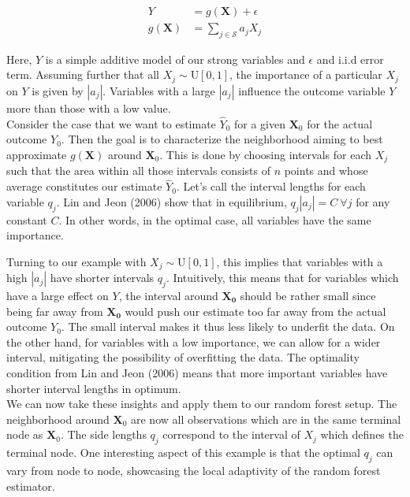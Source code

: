 {\begin{align*}
    Y &= g(\mathbf{X}) + \epsilon \\
    g(\mathbf{X}) &= \sum_{j \in \mathcal{S}} a_j X_j
\end{align*}

Here, $Y$ is a simple additive model of our strong variables and $\epsilon$ and i.i.d error term.
Assuming further that all $X_j \sim \text{U}[0, 1]$, the importance of a particular $X_j$ on $Y$ is given by $|a_j|$. Variables with a large $|a_j|$ influence the outcome variable $Y$ more than those with a low value. \\


Consider the case that we want to estimate $\hat{Y}_0$ for a given $\mathbf{X}_0$ for the actual outcome $Y_0$. 
Then the goal is to characterize the neighborhood aiming to best approximate $g(\mathbf{X})$ around $\mathbf{X}_0$. 
This is done by choosing intervals for each $X_j$ such that the area within all those intervals consists of $n$ points and whose average constitutes our estimate $\hat{Y}_0$. 
Let's call the interval lengths for each variable $q_j$. Lin and Jeon (2006) show that in equilibrium, $q_j |a_j| = C \ \forall j$ for any constant $C$. 
In other words, in the optimal case, all variables have the same importance. 

Turning to our example with $X_j \sim \text{U}[0, 1]$, this implies that variables with a high $|a_j|$ have shorter intervals $q_j$. 
Intuitively, this means that for variables which have a large effect on $Y$, the interval around $\mathbf{X_0}$ should be rather small since being far away from $\mathbf{X_0}$ would push our estimate too far away from the actual outcome $Y_0$. 
The small interval makes it thus less likely to underfit the data.
On the other hand, for variables with a low importance, we can allow for a wider interval, mitigating the possibility of overfitting the data. 
The optimality condition from Lin and Jeon (2006) means that more important variables have shorter interval lengths in optimum. \\

We can now take these insights and apply them to our random forest setup.
The neighborhood around $\mathbf{X}_0$ are now all observations which are in the same terminal node as $\mathbf{X}_0$. 
The side lengths $q_j$ correspond to the interval of $X_j$ which defines the terminal node. 
One interesting aspect of this example is that the optimal $q_j$ can vary from node to node, showcasing the local adaptivity of the random forest estimator.

}
